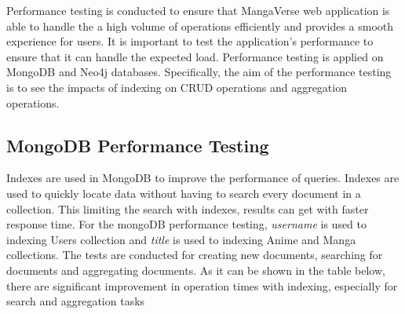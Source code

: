 Performance testing is conducted to ensure that MangaVerse web application is able to handle the 
a high volume of operations efficiently and provides a smooth experience for users. 
It is important to test the application's performance to ensure that it 
can handle the expected load. Performance testing is applied on MongoDB and Neo4j databases.
Specifically, the aim of the performance testing is to see the impacts of indexing on CRUD operations
and aggregation operations. 

\subsection*{MongoDB Performance Testing}
Indexes are used in MongoDB to improve the performance of queries. Indexes are used to quickly locate data without having to search every document in a collection.
This limiting the search with indexes, results can get with faster response time.
For the mongoDB performance testing, \textit{username} is used to indexing Users collection and \textit{title} is
used to indexing Anime and Manga collections. The tests are conducted for creating new documents, searching for documents and aggregating documents.
As it can be shown in the table below, there are significant improvement in operation times with indexing, especially for search and aggregation tasks

